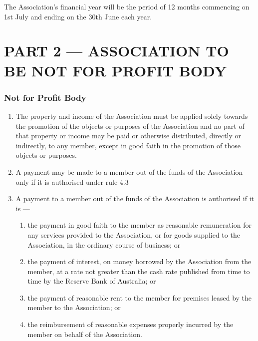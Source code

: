The Association's financial year will be the period of 12 months commencing on 1st July and ending on the 30th June each year.

\hypertarget{part-2-association-to-be-not-for-profit-body}{%
\part{PART 2 --- ASSOCIATION TO BE NOT FOR PROFIT BODY}\label{part-2-association-to-be-not-for-profit-body}}

\hypertarget{not-for-profit-body}{%
\section{Not for Profit Body}\label{not-for-profit-body}}

\begin{enumerate}

\item The property and income of the Association must be applied solely towards the promotion of the objects or purposes of the Association and no part of that property or income may be paid or otherwise distributed, directly or indirectly, to any member, except in good faith in the promotion of those objects or purposes.
\item A payment may be made to a member out of the funds of the Association only if it is authorised under rule 4.3
\item A payment to a member out of the funds of the Association is authorised if it is ---

  \begin{enumerate}
  
  \item the payment in good faith to the member as reasonable remuneration for any services provided to the Association, or for goods supplied to the Association, in the ordinary course of business; or
  \item the payment of interest, on money borrowed by the Association from the member, at a rate not greater than the cash rate published from time to time by the Reserve Bank of Australia; or
  \item the payment of reasonable rent to the member for premises leased by the member to the Association; or
  \item the reimbursement of reasonable expenses properly incurred by the member on behalf of the Association.
  \end{enumerate}
\end{enumerate}

